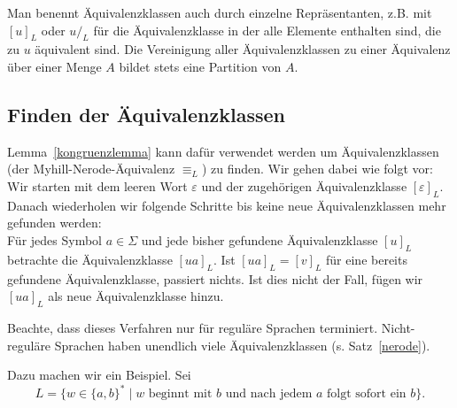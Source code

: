\documentclass[11pt, a4paper]{article}
\theoremstyle{definition}
\theoremstyle{plain}
\begin{document}
Man benennt Äquivalenzklassen auch durch einzelne Repräsentanten, z.B. mit \( [u]_L \) oder \( u/_L \) für die Äquivalenzklasse in der alle Elemente enthalten sind, die zu \( u \) äquivalent sind.
Die Vereinigung aller Äquivalenzklassen zu einer Äquivalenz über einer Menge \( A \) bildet stets eine Partition von \( A \).

\subsection*{Finden der Äquivalenzklassen}
Lemma~\ref{kongruenzlemma} kann dafür verwendet werden um Äquivalenzklassen (der Myhill-Nerode-Äquivalenz \( \equiv_L \)) zu finden. Wir gehen dabei wie folgt vor:\\
Wir starten mit dem leeren Wort \( \varepsilon \) und der zugehörigen Äquivalenzklasse \( [\varepsilon]_L \). Danach wiederholen wir folgende Schritte bis keine neue Äquivalenzklassen mehr gefunden werden:\\
Für jedes Symbol \( a \in \Sigma \) und jede bisher gefundene Äquivalenzklasse \( [u]_L \) betrachte die Äquivalenzklasse \( [ua]_L \). Ist \( [ua]_L = [v]_L \) für eine bereits gefundene Äquivalenzklasse, passiert nichts. Ist dies nicht der Fall, fügen wir \( [ua]_L \) als neue Äquivalenzklasse hinzu.\par
Beachte, dass dieses Verfahren nur für reguläre Sprachen terminiert. Nicht-reguläre Sprachen haben unendlich viele Äquivalenzklassen (s. Satz~\ref{nerode}).\par
Dazu machen wir ein Beispiel. Sei 
\[
	L = \{ w \in \{ a, b \}^\ast \mid w \text{ beginnt mit } b \text{ und nach jedem } a \text{ folgt sofort ein } b \}.
\]
\end{document}
